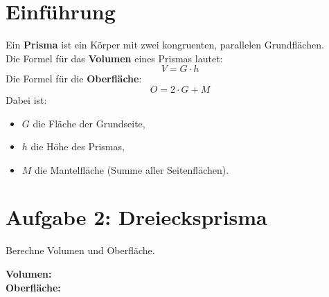 \section*{Einführung}

Ein \textbf{Prisma} ist ein Körper mit zwei kongruenten, parallelen Grundflächen.\\
Die Formel für das \textbf{Volumen} eines Prismas lautet:
\[
V = G \cdot h
\]
Die Formel für die \textbf{Oberfläche}:
\[
O = 2 \cdot G + M
\]
Dabei ist:
\begin{itemize}
  \item \( G \) die Fläche der Grundseite,
  \item \( h \) die Höhe des Prismas,
  \item \( M \) die Mantelfläche (Summe aller Seitenflächen).
\end{itemize}




\vspace{1cm}


\section*{Aufgabe 2: Dreiecksprisma}

Berechne Volumen und Oberfläche.

\begin{center}
\end{center}

\vspace{1cm}

\textbf{Volumen:} \\
\textbf{Oberfläche:} 

\newpage

